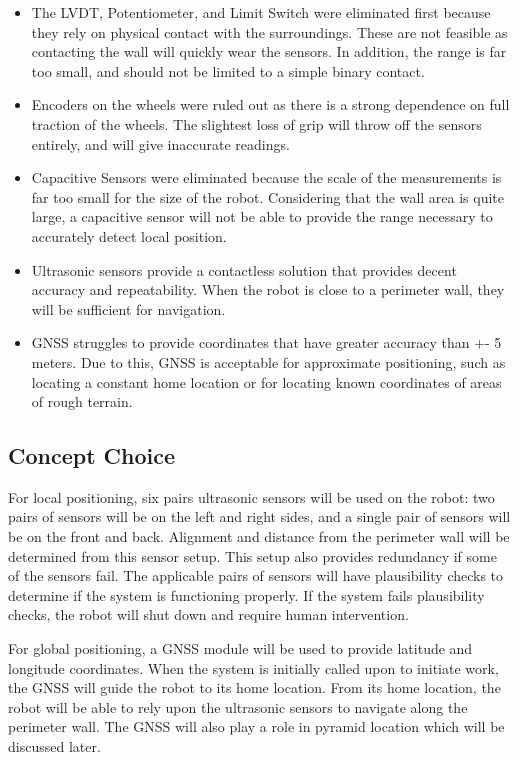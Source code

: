 \documentclass[12pt]{article}
\begin{document}
\begin{itemize}
\item The LVDT, Potentiometer, and Limit Switch were eliminated first because they rely on physical contact with the surroundings. These are not feasible as contacting the wall will quickly wear the sensors. In addition, the range is far too small, and should not be limited to a simple binary contact.

\item Encoders on the wheels were ruled out as there is a strong dependence on full traction of the wheels. The slightest loss of grip will throw off the sensors entirely, and will give inaccurate readings.

\item Capacitive Sensors were eliminated because the scale of the measurements is far too small for the size of the robot. Considering that the wall area is quite large, a capacitive sensor will not be able to provide the range necessary to accurately detect local position.

\item Ultrasonic sensors provide a contactless solution that provides decent accuracy and repeatability. When the robot is close to a perimeter wall, they will be sufficient for navigation.

\item GNSS struggles to provide coordinates that have greater accuracy than +- 5 meters. Due to this, GNSS is acceptable for approximate positioning, such as locating a constant home location or for locating known coordinates of areas of rough terrain. 
\end{itemize}

\subsection{Concept Choice}
For local positioning, six pairs ultrasonic sensors will be used on the robot: two pairs of sensors will be on the left and right sides, and a single pair of sensors will be on the front and back. Alignment and distance from the perimeter wall will be determined from this sensor setup. This setup also provides redundancy if some of the sensors fail. The applicable pairs of sensors will have plausibility checks to determine if the system is functioning properly. If the system fails plausibility checks, the robot will shut down and require human intervention.

For global positioning, a GNSS module will be used to provide latitude and longitude coordinates. When the system is initially called upon to initiate work, the GNSS will guide the robot to its home location. From its home location, the robot will be able to rely upon the ultrasonic sensors to navigate along the perimeter wall. The GNSS will also play a role in pyramid location which will be discussed later. 
\end{document}
